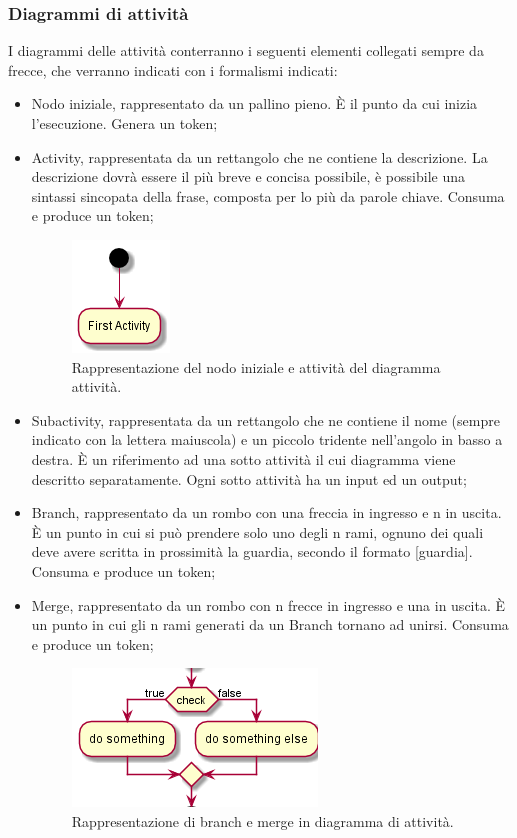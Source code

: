 \documentclass[NormeDiProgetto.tex]{subfiles}
\begin{document}
\subsubsection{Diagrammi di attività}
I diagrammi delle attività conterranno i seguenti elementi collegati sempre da frecce, che verranno indicati con i formalismi indicati:
\begin{itemize}
\item  Nodo iniziale, rappresentato da un pallino pieno. \`E il punto da cui inizia l'esecuzione. Genera un token;
\item  Activity, rappresentata da un rettangolo che ne contiene la descrizione. La descrizione dovrà essere il più breve e concisa possibile, è possibile una sintassi sincopata della frase, composta per lo più da parole chiave. Consuma e produce un token;
\begin{figure}[H]
	\centering
	\includegraphics[width=0.2\linewidth]{progettazione/activity}
	\caption{Rappresentazione del nodo iniziale e attività del diagramma attività.}
	\label{fig:activity}
\end{figure}

\item Subactivity, rappresentata da un rettangolo che ne contiene il nome (sempre indicato con la lettera maiuscola) e un piccolo tridente nell'angolo in basso a destra. \`E un riferimento ad una sotto attività il cui diagramma viene descritto separatamente. Ogni sotto attività ha un input ed un output;

\item Branch, rappresentato da un rombo con una freccia in ingresso e n in uscita. \`E
un punto in cui si può prendere solo uno degli n rami, ognuno dei quali deve avere
scritta in prossimità la guardia, secondo il formato [guardia]. Consuma e produce
un token;
\item Merge, rappresentato da un rombo con n frecce in ingresso e una in uscita. \`E
un punto in cui gli n rami generati da un Branch tornano ad unirsi. Consuma e produce un token;
\begin{figure}[H]
	\centering
	\includegraphics[width=0.4\linewidth]{progettazione/activitybranch}
	\caption{Rappresentazione di branch e merge in diagramma di attività.}
	\label{fig:activitybranch}
\end{figure}


\end{itemize}
\end{document}
